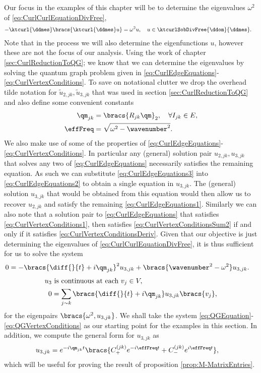 Our focus in the examples of this chapter will be to determine the eigenvalues $\omega^2$ of \eqref{eq:CurlCurlEquationDivFree},
\begin{align*}
	-\ktcurl{\ddmes}\bracs{\ktcurl{\ddmes}u} &= \omega^2 u, \quad u\in\ktcurlSobDivFree{\ddom}{\ddmes}.
\end{align*}
Note that in the process we will also determine the eigenfunctions $u$, however these are not the focus of our analysis.
Using the work of chapter \ref{sec:CurlReductionToQG}; we know that we can determine the eigenvalues by solving the quantum graph problem given in \eqref{eq:CurlEdgeEquations}-\eqref{eq:CurlVertexConditions}.
To save on notational clutter we drop the overhead tilde notation for $\widetilde{u}_{2,jk},\widetilde{u}_{3,jk}$ that was used in section \ref{sec:CurlReductionToQG} and also define some convenient constants
\begin{align*}
	\qm_{jk} &= \bracs{R_{jk}\qm}_2, \quad \forall I_{jk}\in E,\\
	\effFreq &= \sqrt{\omega^2 - \wavenumber^2}.
\end{align*}
We also make use of some of the properties of \eqref{eq:CurlEdgeEquations}-\eqref{eq:CurlVertexConditions}.
In particular any (general) solution pair $u_{2,jk},u_{3,jk}$ that solves any two of \eqref{eq:CurlEdgeEquations} necessarily satisfies the remaining equation.
As such we can substitute \eqref{eq:CurlEdgeEquations3} into \eqref{eq:CurlEdgeEquations2} to obtain a single equation in $u_{3,jk}$.
The (general) solution $u_{3,jk}$ that would be obtained from this equation would then allow us to recover $u_{2,jk}$ and satisfy the remaining \eqref{eq:CurlEdgeEquations1}.
Similarly we can also note that a solution pair to \eqref{eq:CurlEdgeEquations} that satisfies \eqref{eq:CurlVertexConditions1}, then satisfies \eqref{eq:CurlVertexConditionsSum2} if and only if it satisfies \eqref{eq:CurlVertexConditionsDeriv}.
Given that our objective is just determining the eigenvalues of \eqref{eq:CurlCurlEquationDivFree}, it is thus sufficient for us to solve the system
\begin{align} \label{eq:QGEquation}
	0 &= -\bracs{\diff{}{t} + i\qm_{jk}}^2 u_{3,jk} + \bracs{\wavenumber^2 - \omega^2}u_{3,jk}.
\end{align}
\begin{subequations} \label{eq:QGVertexConditions}
	\begin{align}
		u_3 &\text{ is continuous at each } v_j\in V, \\
		0 &= \sum_{j\sim k} \bracs{\diff{}{t} + i\qm_{jk}}u_{3,jk}\bracs{v_j},
	\end{align}
\end{subequations}
for the eigenpairs $\bracs{\omega^2, u_{3,jk}}$.
We shall take the system \eqref{eq:QGEquation}-\eqref{eq:QGVertexConditions} as our starting point for the examples in this section.
In addition, we compute the general form for $u_{3,jk}$ as
\begin{align} \label{eq:CurlEdgeEqnGenSol}
	u_{3,jk} &= e^{-i\qm_{jk}t}\bracs{ C_{+}^{(jk)}e^{-i\effFreq t} + C_{-}^{(jk)}e^{i\effFreq t} },
\end{align}
which will be useful for proving the result of proposition \ref{prop:M-MatrixEntries}. \newline

